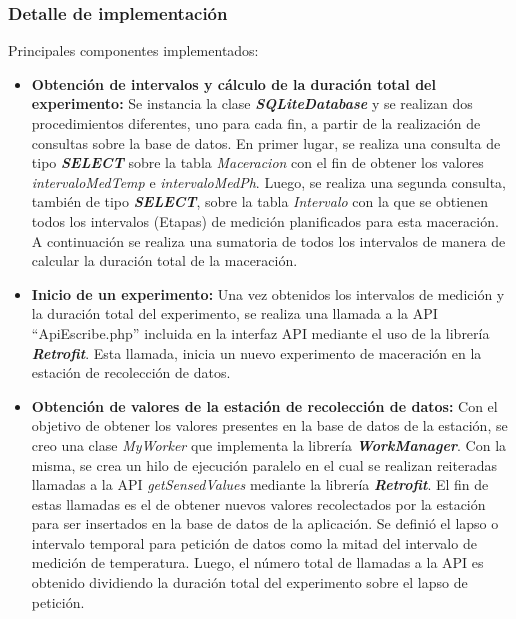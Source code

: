             \subsubsection{Detalle de implementación}
            \par Principales componentes implementados:
            \begin{itemize}
                \item  \textbf{Obtención de intervalos y cálculo de la duración total del experimento:} Se instancia la clase \textbf{\textit{\gls{SQLiteDatabase}}} y se realizan dos procedimientos diferentes, uno para cada fin, a partir de la realización de consultas sobre la base de datos. En primer lugar, se realiza una consulta de tipo \textbf{\textit{\gls{SELECT}}} sobre la tabla \textit{Maceracion} con el fin de obtener los valores \textit{intervaloMedTemp} e \textit{intervaloMedPh}. Luego, se realiza una segunda consulta, también de tipo \textbf{\textit{\gls{SELECT}}}, sobre la tabla \textit{Intervalo} con la que se obtienen todos los intervalos (Etapas) de medición planificados para esta maceración. A continuación se realiza una sumatoria de todos los intervalos de manera de calcular la duración total de la maceración.
                
                \item \textbf{Inicio de un experimento:} Una vez obtenidos los intervalos de medición y la duración total del experimento, se realiza una llamada a la API ``ApiEscribe.php'' incluida en la interfaz API mediante el uso de la librería \textbf{\textit{\gls{Retrofit}}}. Esta llamada, inicia un nuevo experimento de maceración en la estación de recolección de datos.
                
                \item \textbf{Obtención de valores de la estación de recolección de datos:} Con el objetivo de obtener los valores presentes en la base de datos de la estación, se creo una clase \textit{MyWorker} que implementa la librería \textbf{\textit{\gls{WorkManager}}}. Con la misma, se crea un hilo de ejecución paralelo en el cual se realizan reiteradas llamadas a la API \textit{getSensedValues} mediante la librería \textbf{\textit{\gls{Retrofit}}}. El fin de estas llamadas es el de obtener nuevos valores recolectados por la estación para ser insertados en la base de datos de la aplicación. Se definió el lapso o intervalo temporal para petición de datos como la mitad del intervalo de medición de temperatura. Luego, el número total de llamadas a la API es obtenido dividiendo la duración total del experimento sobre el lapso de petición.
                

\end{itemize}
